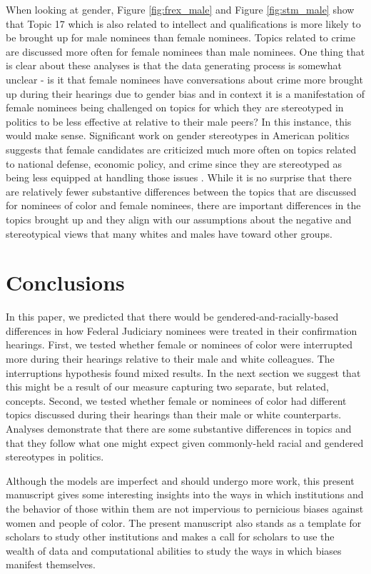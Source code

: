 \documentclass [12pt]{article}
\begin{document}
When looking at gender, Figure \ref{fig:frex_male} and Figure \ref{fig:stm_male} show that Topic 17 which is also related to intellect and qualifications is more likely to be brought up for male nominees than female nominees. Topics related to crime are discussed more often for female nominees than male nominees. One thing that is clear about these analyses is that the data generating process is somewhat unclear - is it that female nominees have conversations about crime more brought up during their hearings due to gender bias and in context it is a manifestation of female nominees being challenged on topics for which they are stereotyped in politics to be less effective at relative to their male peers? In this instance, this would make sense. Significant work on gender stereotypes in American politics suggests that female candidates are criticized much more often on topics related to national defense, economic policy, and crime since they are stereotyped as being less equipped at handling those issues \citep{Huddy1993, Sanbonmatsu2009, Hayes2011}. While it is no surprise that there are relatively fewer substantive differences between the topics that are discussed for nominees of color and female nominees, there are important differences in the topics brought up and they align with our assumptions about the negative and stereotypical views that many whites and males have toward other groups. 

	    
\section{Conclusions}
In this paper, we predicted that there would be gendered-and-racially-based differences in how Federal Judiciary nominees were treated in their confirmation hearings. First, we tested whether female or nominees of color were interrupted more during their hearings relative to their male and white colleagues. The interruptions hypothesis found mixed results. In the next section we suggest that this might be a result of our measure capturing two separate, but related, concepts. Second, we tested whether female or nominees of color had different topics discussed during their hearings than their male or white counterparts. Analyses demonstrate that there are some substantive differences in topics and that they follow what one might expect given commonly-held racial and gendered stereotypes in politics. 

Although the models are imperfect and should undergo more work, this present manuscript gives some interesting insights into the ways in which institutions and the behavior of those within them are not impervious to pernicious biases against women and people of color. The present manuscript also stands as a template for scholars to study other institutions and makes a call for scholars to use the wealth of data and computational abilities to study the ways in which biases manifest themselves. 
\end{document}
